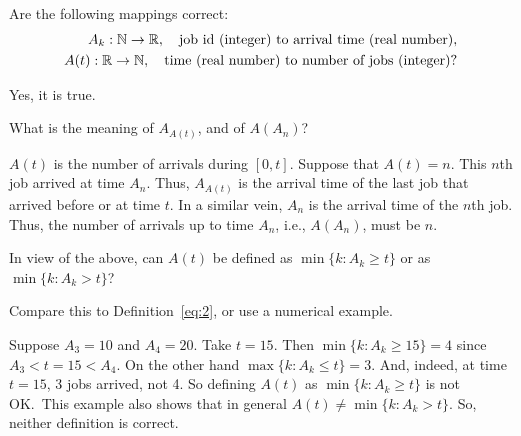 \begin{exercise}\label{ex:60}
Are the following mappings correct:
\begin{align*}
 A_k : \mathbb{N} \to \mathbb{R}, \quad{\text{job id (integer) to arrival time (real number)}}, \\
 A(t) : \mathbb{R}\to \mathbb{N}, \quad{\text{time (real number) to number of jobs (integer)}}?
\end{align*}
\begin{solution}
  Yes, it is true.
\end{solution}
\end{exercise}

\begin{exercise}\label{ex:61}
 What is the meaning of $A_{A(t)}$, and of $A(A_n)$?
\begin{solution}
 $A(t)$ is the number of arrivals during $[0,t]$. Suppose that
 $A(t) = n$. This $n$th job arrived at time $A_n$. Thus, $A_{A(t)}$
 is the arrival time of the last job that arrived before or at time
 $t$. In a similar vein, $A_n$ is the arrival time of the $n$th
 job. Thus, the number of arrivals up to time $A_n$, i.e., $A(A_n)$,
 must be $n$.
\end{solution}
\end{exercise}

\begin{exercise}\label{ex:22}
 In  view of the above, can $A(t)$ be defined as $\min\{k : A_k \geq t\}$ or as $\min\{k: A_k > t\}$?
\begin{hint}
Compare this to Definition~\cref{eq:2}, or use a numerical example.
\end{hint}
\begin{solution}
  Suppose $A_3 = 10$ and $A_4 = 20$.
  Take $t=15$.
  Then $\min\{k : A_k \geq 15\} = 4$ since $A_3 < t=15 < A_4$.
  On the other hand $\max\{k : A_k \leq t\} = 3$.
  And, indeed, at time $t=15$, 3 jobs arrived, not 4.
  So defining $A(t)$ as $\min\{k : A_k \geq t\}$ is not OK.\
  This example also shows that in general $A(t) \neq \min\{k : A_k > t\}$.
  So, neither definition is correct.
\end{solution}
\end{exercise}



